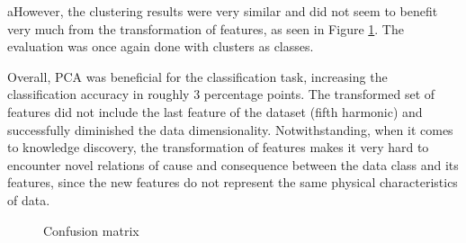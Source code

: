 \documentclass{article}
\begin{document}
aHowever, the clustering results were very similar and did not seem to benefit very much from the transformation of features, as seen in Figure \ref{fig:cfmatrix_ph_pca}. The evaluation was once again done with clusters as classes.

Overall, PCA was beneficial for the classification task, increasing the classification accuracy in roughly 3 percentage points. The transformed set of features did not include the last feature of the dataset (fifth harmonic) and successfully diminished the data dimensionality. Notwithstanding, when it comes to knowledge discovery, the transformation of features makes it very hard to encounter novel relations of cause and consequence between the data class and its features, since the new features do not represent the same physical characteristics of data.

\begin{figure}
\centering
{} 
\caption{Confusion matrix} 
\label{fig:cfmatrix_ph_pca}
\end{figure} 
\end{document}
